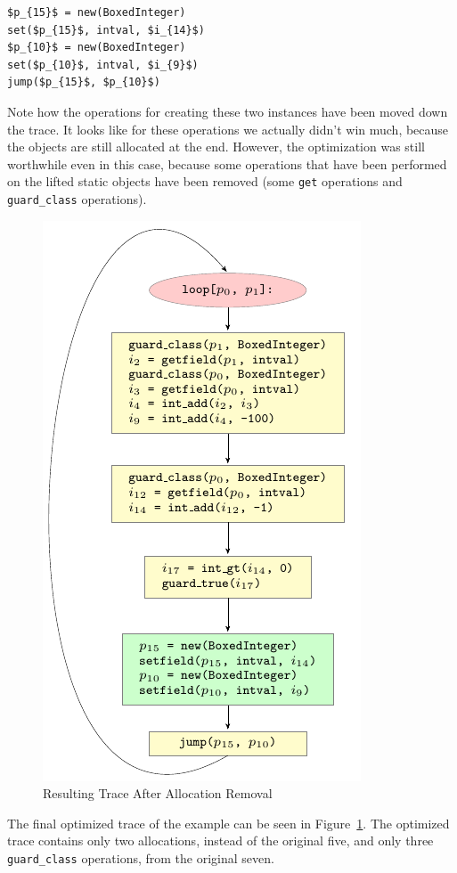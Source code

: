 \documentclass{sigplanconf}
\begin{document}
\begin{lstlisting}[mathescape,xleftmargin=20pt]
$p_{15}$ = new(BoxedInteger)
set($p_{15}$, intval, $i_{14}$)
$p_{10}$ = new(BoxedInteger)
set($p_{10}$, intval, $i_{9}$)
jump($p_{15}$, $p_{10}$)
\end{lstlisting}

Note how the operations for creating these two instances have been moved down the
trace. It looks like for these operations we actually didn't win much, because
the objects are still allocated at the end. However, the optimization was still
worthwhile even in this case, because some operations that have been performed
on the lifted static objects have been removed (some \lstinline{get} operations
and \lstinline{guard_class} operations).

\begin{figure}
\includegraphics{figures/step1.pdf}
\caption{Resulting Trace After Allocation Removal}
\label{fig:step1}
\end{figure}

The final optimized trace of the example can be seen in Figure~\ref{fig:step1}.
The optimized trace contains only two allocations, instead of the original five,
and only three \lstinline{guard_class} operations, from the original seven.
\end{document}
